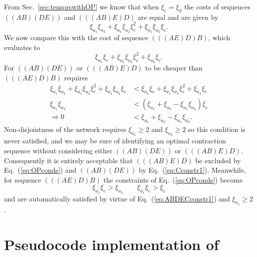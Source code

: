 \documentclass[aps,pre,reprint,superscriptaddress,amsfonts,amsmath,showpacs,nofootinbib,floatfix]{revtex4-1}
\newcommand{\Eref}[1]{Eq.~(\ref{#1})}
\newcommand{\sref}[1]{Sec.~\ref{#1}}
\newcommand{\psref}[1]{\protect{Sec.~\ref{#1}}}
\newcommand{\xc}{\xi_c}
\newcommand{\xd}{\xi_d}
\begin{document}
From \sref{sec:tensorswithOP} we know that when $\xc=\xd$ the costs of sequences $((AB)(DE))$ and $(((AB)E)D)$ are equal and are given by
\begin{equation}
\xi_{a_1}\xi_{a_2} + \xi_{a_1}\xi_{a_2}\xc^2 + \xi_{a_1}\xi_{a_2}\xc.
\end{equation}
We now compare this with the cost of sequence $(((AE)D)B)$, which evaluates to
\begin{equation}
\xi_{a_1}\xc+\xi_{a_1}\xi_{a_2}\xc^2+\xi_{a_2}\xc. 
\end{equation}
For $((AB)(DE))$ or $(((AB)E)D)$ to be cheaper than $(((AE)D)B)$ requires
\begin{equation}
\begin{split}
\xi_{a_1}\xi_{a_2} + \xi_{a_1}\xi_{a_2}\xc^2 + \xi_{a_1}\xi_{a_2}\xc &< \xi_{a_1}\xc+\xi_{a_1}\xi_{a_2}\xc^2+\xi_{a_2}\xc\\
\xi_{a_1}\xi_{a_2} &< (\xi_{a_1}+\xi_{a_2}-\xi_{a_1}\xi_{a_2})\xc\\
\Rightarrow 0 &< \xi_{a_1}+\xi_{a_2}-\xi_{a_1}\xi_{a_2}.
\end{split}
\end{equation}
Non-disjointness of the network requires $\xi_{a_1}\geq2$ and $\xi_{a_2}\geq2$ so this condition is never satisfied, and we may be sure of identifying an optimal contraction sequence without considering either $((AB)(DE))$ or $(((AB)E)D)$. Consequently it is entirely acceptable that $(((AB)E)D)$ be excluded by \Eref{eq:OPconds} and $((AB)(DE))$ by \Eref{eq:Cconstr1}. Meanwhile, for sequence $(((AE)D)B)$ %
the constraints of \Eref{eq:OPconds} %
become
\begin{equation}
\xi_{a_1}\xc>\xi_{a_2}\qquad\xi_{a_1}\xc>\xc
\end{equation}
and are automatically satisfied by virtue of \Eref{eq:ABDECconstr1} and $\xi_{a_1}\geq2$.

\section{Pseudocode implementation of \psref{sec:beyond}\label{sec:pseudocode}}
\end{document}
